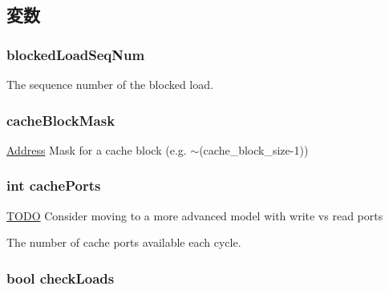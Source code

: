 \subsection{変数}
\hypertarget{classLSQUnit_a3fca34b247fd8d081557578f8ca60fe3}{
\subsubsection[{blockedLoadSeqNum}]{ {\bf blockedLoadSeqNum}}}
\label{classLSQUnit_a3fca34b247fd8d081557578f8ca60fe3}
The sequence number of the blocked load. \hypertarget{classLSQUnit_af4264b12b32db39099b579e1ed670312}{
\subsubsection[{cacheBlockMask}]{ {\bf cacheBlockMask}}}
\label{classLSQUnit_af4264b12b32db39099b579e1ed670312}
\hyperlink{classAddress}{Address} Mask for a cache block (e.g. $\sim$(cache\_\-block\_\-size-\/1)) \hypertarget{classLSQUnit_ab2e23636971c40e7ed945026b2a184e1}{
\subsubsection[{cachePorts}]{\setlength{\rightskip}{0pt plus 5cm}int {\bf cachePorts}}}
\label{classLSQUnit_ab2e23636971c40e7ed945026b2a184e1}
\begin{Desc}
\item[\hyperlink{todo__todo000038}{TODO}]Consider moving to a more advanced model with write vs read ports \end{Desc}
The number of cache ports available each cycle. \hypertarget{classLSQUnit_a602a9ccaf8b313e8923d8b07ec5bc439}{
\subsubsection[{checkLoads}]{\setlength{\rightskip}{0pt plus 5cm}bool {\bf checkLoads}}}
